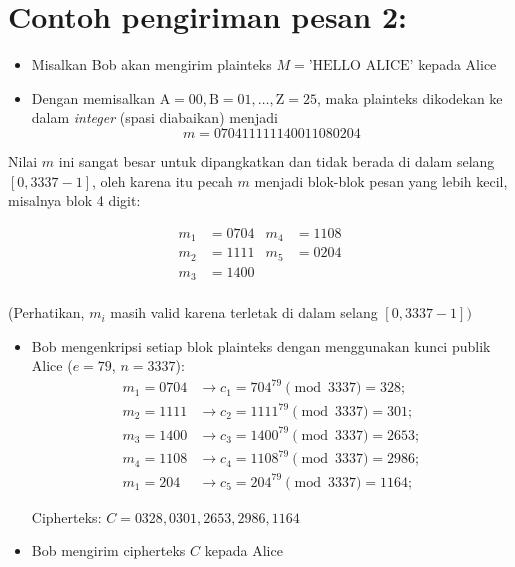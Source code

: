 \documentclass{article}
\begin{document}
\newpage


\section*{Contoh pengiriman pesan 2:}
\begin{itemize}
    \item Misalkan Bob akan mengirim plainteks $M = \text{'HELLO ALICE'}$ kepada Alice
    \item Dengan memisalkan $\text{A} = 00, \text{B} = 01, \dots, \text{Z} = 25$, maka plainteks dikodekan ke dalam \textit{integer} (spasi diabaikan) menjadi
    \[ m = 070411111140011080204 \]
\end{itemize}

Nilai $m$ ini sangat besar untuk dipangkatkan dan tidak berada di dalam selang $[0, 3337-1]$, oleh karena itu pecah $m$ menjadi blok-blok pesan yang lebih kecil, misalnya blok 4 digit:

\begin{align*}
    m_1 &= 0704 & m_4 &= 1108 \\
    m_2 &= 1111 & m_5 &= 0204 \\
    m_3 &= 1400 & \\
\end{align*}

(Perhatikan, $m_i$ masih valid karena terletak di dalam selang $[0, 3337 - 1])$

\newpage


\begin{flushright}
\end{flushright}

\begin{itemize}
    \item Bob mengenkripsi setiap blok plainteks dengan menggunakan kunci publik Alice ($e = 79$, $n = 3337$):
    \begin{align*}
        m_1 = 0704 & \to c_1 = 704^{79} \pmod{3337} = 328; \\
        m_2 = 1111 & \to c_2 = 1111^{79} \pmod{3337} = 301; \\
        m_3 = 1400 & \to c_3 = 1400^{79} \pmod{3337} = 2653; \\
        m_4 = 1108 & \to c_4 = 1108^{79} \pmod{3337} = 2986; \\
        m_1 = 204 & \to c_5 = 204^{79} \pmod{3337} = 1164;
    \end{align*}

    Cipherteks: $C = 0328, 0301, 2653, 2986, 1164$

    \item Bob mengirim cipherteks $C$ kepada Alice
\end{itemize}
\end{document}
